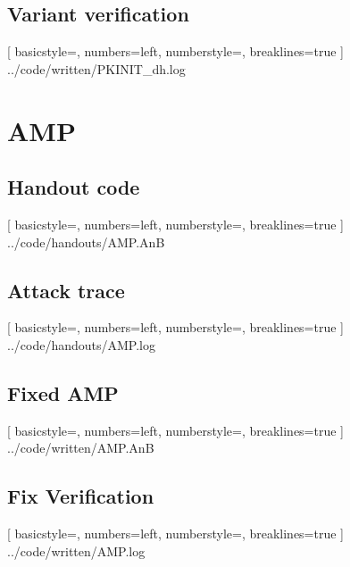 \documentclass{article}
\begin{document}
\subsection{Variant verification}
\label{app:pkdh-log}

	[
		basicstyle=\footnotesize,
		numbers=left,
		numberstyle=\tiny,
		breaklines=true
	]
	{../code/written/PKINIT_dh.log}
	
\section{AMP}

\subsection{Handout code}

	[
		basicstyle=\footnotesize,
		numbers=left,
		numberstyle=\tiny,
		breaklines=true
	]
	{../code/handouts/AMP.AnB}

\subsection{Attack trace}
\label{app:amptrace}

	[
		basicstyle=\footnotesize,
		numbers=left,
		numberstyle=\tiny,
		breaklines=true
	]
	{../code/handouts/AMP.log}

\subsection{Fixed AMP}
\label{app:ampfix}

	[
		basicstyle=\footnotesize,
		numbers=left,
		numberstyle=\tiny,
		breaklines=true
	]
	{../code/written/AMP.AnB}

\subsection{Fix Verification}
\label{app:ampver}

	[
		basicstyle=\footnotesize,
		numbers=left,
		numberstyle=\tiny,
		breaklines=true
	]
	{../code/written/AMP.log}
\end{document}
